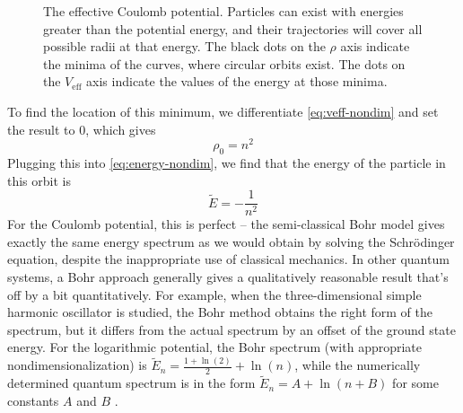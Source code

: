 \documentclass[12pt,twoside]{reedthesis}
\newcommand{\eqn}[1]{\begin{equation}#1\end{equation}}
\begin{document}
\begin{figure}[h]
\caption[The effective Coulomb potential]{The effective Coulomb potential. Particles can exist with energies greater than the potential energy, and their trajectories will cover all possible radii at that energy. The black dots on the $\rho$ axis indicate the minima of the curves, where circular orbits exist. The dots on the $V_{\mathrm{eff}}$ axis indicate the values of the energy at those minima.}
\label{fig:hveff}
\end{figure}

To find the location of this minimum, we differentiate \eqref{eq:veff-nondim} and set the result to $0$, which gives
\eqn{
\rho_0 = n^2
\label{eq:rho-n}
}
Plugging this into \eqref{eq:energy-nondim}, we find that the energy of the particle in this orbit is
\eqn{
\tilde{E} = -\frac{1}{n^2}
}
For the Coulomb potential, this is perfect -- the semi-classical Bohr model gives exactly the same energy spectrum as we would obtain by solving the Schr\"odinger equation, despite the inappropriate use of classical mechanics. In other quantum systems, a Bohr approach generally gives a qualitatively reasonable result that's off by a bit quantitatively. For example, when the three-dimensional simple harmonic oscillator is studied, the Bohr method obtains the right form of the spectrum, but it differs from the actual spectrum by an offset of the ground state energy. For the logarithmic potential, the Bohr spectrum (with appropriate nondimensionalization) is $\tilde{E}_n = \frac{1 + \ln(2)}{2}+\ln(n)$, while the numerically determined quantum spectrum is in the form $\tilde{E}_n = A + \ln(n+B)$ for some constants $A$ and $B$ \cite{Garon}.
\end{document}
